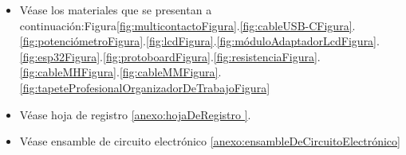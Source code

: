 \begin{itemize}
        \item Véase los materiales que se presentan a continuación:Figura\ref{fig:multicontactoFigura}.\ref{fig:cableUSB-CFigura}.\ref{fig:potenciómetroFigura}.\ref{fig:lcdFigura}.\ref{fig:móduloAdaptadorLcdFigura}.\ref{fig:esp32Figura}.\ref{fig:protoboardFigura}.\ref{fig:resistenciaFigura}.\ref{fig:cableMHFigura}.\ref{fig:cableMMFigura}.\ref{fig:tapeteProfesionalOrganizadorDeTrabajoFigura}
        \item Véase hoja de registro \ref{anexo:hojaDeRegistro }.
        \item Véase ensamble de circuito electrónico \ref{anexo:ensambleDeCircuitoElectrónico}
    \end{itemize}
